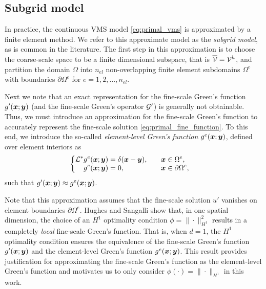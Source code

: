 \subsection{Subgrid model}

In practice, the continuous VMS model
\eqref{eq:primal_vms} is approximated by a finite
element method. We refer to this approximate
model as the \emph{subgrid model}, as is common
in the literature. The first step in this
approximation is to choose the coarse-scale space to be
a finite dimensional subspace, that is
$\overline{\mathcal{V}} = \mathcal{V}^h$, and partition the domain
$\Omega$ into $n_{el}$ non-overlapping finite
element subdomains $\Omega^e$ with boundaries
$\partial \Omega^e$ for $e=1,2,\dots,n_{el}$.

Next we note that an exact representation for the
fine-scale Green's function $g'(\boldsymbol{x};\boldsymbol{y})$ (and
the fine-scale Green's operator $\mathcal{G}'$) is
generally not obtainable. Thus, we must introduce
an approximation for the fine-scale Green's function
to accurately represent the fine-scale solution
\eqref{eq:primal_fine_function}. To this end, we
introduce the so-called \emph{element-level Green's
function} $g^e(\boldsymbol{x};\boldsymbol{y})$, defined over element
interiors as
%
\begin{gather}
\begin{cases}
\begin{aligned}
\mathcal{L}^* g^e(\boldsymbol{x}; \boldsymbol{y}) &= \delta(\boldsymbol{x} - \boldsymbol{y}),
\quad & & \boldsymbol{x} \in \Omega^e, \\
g^e(\boldsymbol{x}; \boldsymbol{y}) &= 0, \quad & & \boldsymbol{x} \in \partial \Omega^e,
\end{aligned}
\end{cases}
\label{eq:primal_elem_greens}
\end{gather}
such that $g'(\boldsymbol{x};\boldsymbol{y}) \approx g^e(\boldsymbol{x};\boldsymbol{y})$.

Note that this approximation assumes that the
fine-scale solution $u'$ vanishes on element boundaries
$\partial \Omega^e$. Hughes and Sangalli
\cite{hughes2007variational} show that, in one spatial
dimension, the choice of an $H^1$ optimality
condition $\phi = \| \cdot \|^2_{H^1}$ results
in a completely \emph{local} fine-scale Green's
function. That is, when $d = 1$, the $H^1$
optimality condition ensures the equivalence
of the fine-scale Green's function
$g'(\boldsymbol{x};\boldsymbol{y})$ and the element-level Green's function
$g^e(\boldsymbol{x};\boldsymbol{y})$. This result provides justification
for approximating the fine-scale Green's function
as the element-level Green's function and motivates
us to only consider $\phi(\cdot) = \| \cdot \|_{H^1}$
in this work.

